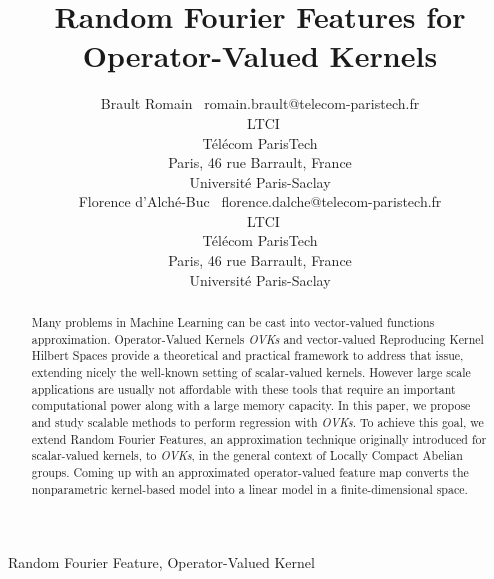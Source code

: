 \documentclass[twoside,11pt]{article}
\begin{document}
\title{Random Fourier Features for Operator-Valued Kernels}

\author{\name{}Brault Romain
       \email~romain.brault@telecom-paristech.fr \\
       \addr~LTCI\\
       T\'el\'ecom ParisTech\\
       Paris, 46 rue Barrault, France \\
       Universit\'e Paris-Saclay \\
       \AND%
       \name{}Florence d'Alch\'e-Buc
       \email~florence.dalche@telecom-paristech.fr \\
       \addr~LTCI\\
       T\'el\'ecom ParisTech\\
       Paris, 46 rue Barrault, France \\
       Universit\'e Paris-Saclay}


\maketitle

\begin{abstract}%
    Many problems in Machine Learning can be cast into
    vector-valued functions approximation. Operator-Valued Kernels
    \emph{\acl{OVK}s} and vector-valued Reproducing Kernel Hilbert Spaces
    provide a theoretical and practical framework to address that issue,
    extending nicely the well-known setting of scalar-valued kernels.
    However large scale applications are usually not affordable with these
    tools that require an important computational power along with a large
    memory capacity. In this paper, we propose and study scalable methods
    to perform regression with \emph{\acl{OVK}s}. To achieve this goal, we
    extend Random Fourier Features, an approximation technique originally
    introduced for scalar-valued kernels, to \emph{\acl{OVK}s}, in the general context of Locally Compact Abelian groups. Coming up with an approximated operator-valued feature map converts the nonparametric kernel-based model into a linear model in a finite-dimensional space.
\end{abstract}

\begin{keywords}
    Random Fourier Feature, Operator-Valued Kernel
\end{keywords}
\end{document}
